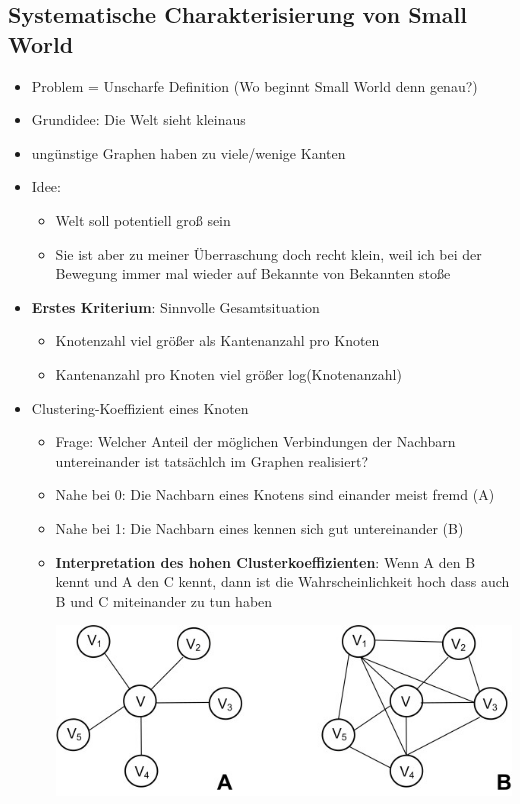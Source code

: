 \documentclass{article} %
\begin{document}
	\subsection{Systematische Charakterisierung von Small World}
	\begin{itemize}
		\item Problem = Unscharfe Definition (Wo beginnt Small World denn genau?)
		\item Grundidee: Die Welt sieht \glqq klein\grqq aus
		\item ungünstige Graphen haben zu viele/wenige Kanten
		\item Idee:
		\begin{itemize}
			\item Welt soll potentiell groß sein 
			\item Sie ist aber zu meiner Überraschung doch recht klein, weil ich bei der Bewegung immer mal wieder auf Bekannte von Bekannten stoße
		\end{itemize}
		\item \textbf{Erstes Kriterium}: Sinnvolle Gesamtsituation
		\begin{itemize}
			\item Knotenzahl viel größer als Kantenanzahl pro Knoten
			\item Kantenanzahl pro Knoten viel größer log(Knotenanzahl)
		\end{itemize}
		\item Clustering-Koeffizient eines Knoten
		\begin{itemize}
			\item Frage: Welcher Anteil der möglichen Verbindungen der Nachbarn untereinander ist tatsächlch im Graphen realisiert?
			\item Nahe bei 0: Die Nachbarn eines Knotens sind einander meist fremd (A)
			\item Nahe bei 1: Die Nachbarn eines kennen sich gut untereinander (B)
			\item \textbf{Interpretation des hohen Clusterkoeffizienten}: \glqq Wenn A den B kennt und A den C kennt, dann ist die Wahrscheinlichkeit hoch dass auch B und C miteinander zu tun haben
			\begin{center}
				\includegraphics[scale=3]{img/cluster_koeffizient.jpg}

\end{center}
\end{itemize}
\end{itemize}
\end{document}
